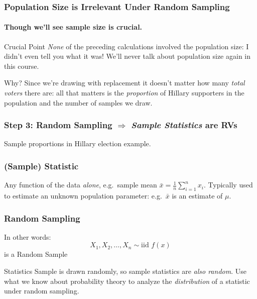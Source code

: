 \documentclass[handout]{beamer}
\begin{document}
\begin{frame}
  \frametitle{Population Size is Irrelevant Under Random Sampling}
  \framesubtitle{Though we'll see sample size is crucial.}

  \begin{block}{Crucial Point}
    \emph{None} of the preceding calculations involved the population size: I didn't even tell you what it was!
    We'll never talk about population size again in this course.
  \end{block}

  \begin{block}{Why?}
    Since we're drawing with replacement it doesn't matter how many \emph{total voters} there are: all that matters is the \emph{proportion} of Hillary supporters in the population and the number of samples we draw. 
  \end{block}

\end{frame}
\begin{frame}
  \frametitle{Step 3: Random Sampling $\Rightarrow$ \emph{Sample Statistics} are RVs} 
  Sample proportions in Hillary election example.
\end{frame}
\begin{frame}
  \frametitle{(Sample) Statistic}

  Any function of the data \emph{alone}, e.g.\ sample mean $\bar{x} = \frac{1}{n}\sum_{i=1}^n x_i$. Typically used to estimate an unknown population parameter: e.g.\ $\bar{x}$ is an estimate of $\mu$.

\end{frame}

\begin{frame}
\frametitle{Random Sampling}
In other words:
	$$X_1, X_2, \hdots, X_n \sim \mbox{iid } f(x)$$
is a \alert{Random Sample}

	\vspace{1em}
\begin{block}{Statistics}
Sample is drawn randomly, so sample statistics are \emph{also random}. Use what we know about probability theory to analyze the \emph{distribution} of a statistic under random sampling.
\end{block}
\end{frame}

\end{document}
